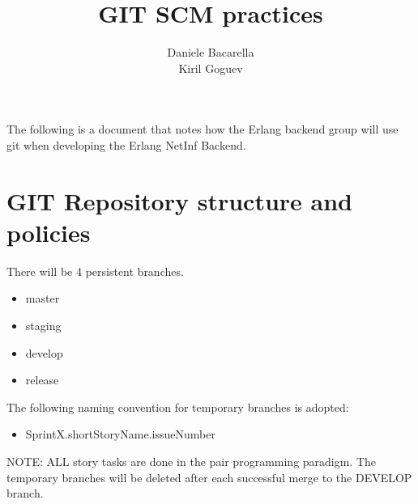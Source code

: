 \documentclass[11pt]{report}
\title{\textbf{GIT SCM practices}}
\author{Daniele Bacarella\\Kiril Goguev}
\date{}
\begin{document}
\maketitle

The following is a document that notes how the Erlang backend group will use git when developing the Erlang NetInf Backend. 

\tableofcontents


\chapter{GIT Repository structure and policies}

There will be 4 persistent branches.
\begin{itemize}
\item master
\item staging
\item develop
\item release
\end{itemize}

The following naming convention for temporary branches is adopted: 

\begin{itemize}
\item SprintX.shortStoryName.issueNumber
\end{itemize}



NOTE: ALL story tasks are done in the pair programming paradigm. The temporary branches will be deleted after each successful merge to the DEVELOP branch.
\end{document}
